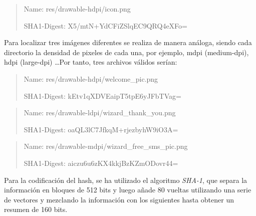 \documentclass[a4paper,11pt,oneside]{book}
\begin{document}
\begin{quote}
\centering
Name: res/drawable-hdpi/icon.png

SHA1-Digest: X5/mtN+YdCFiZSlqEC9QRQ4eXFo=
\end{quote}

Para localizar tres imágenes diferentes se realiza de manera análoga, siendo cada directorio la densidad de pixeles de cada una, por ejemplo, mdpi (medium-dpi), hdpi (large-dpi) \ldots Por tanto, tres archivos válidos serían:

\begin{quote}
\centering
Name: res/drawable-hdpi/welcome\_{}pic.png

SHA1-Digest: kEtv1qXDVEaipT5tpE6yJFbTVag=
\end{quote}

\begin{quote}
\centering
Name: res/drawable-ldpi/wizard\_{}thank\_{}you.png

SHA1-Digest: oaQL3lC7JfkqM+rjezbyhW9iO3A=
\end{quote}


\begin{quote}
\centering
Name: res/drawable-mdpi/wizard\_{}free\_{}sms\_{}pic.png

SHA1-Digest: aiczu6u6zKX4kkjBzKZmODovr44=
\end{quote}


Para la codificación del hash, se ha utilizado el algoritmo \emph{SHA-1}, que separa la información en bloques de 512 bits y luego añade 80 vueltas utilizando una serie de vectores y mezclando la información con los siguientes hasta obtener un resumen de 160 bits.
\end{document}
